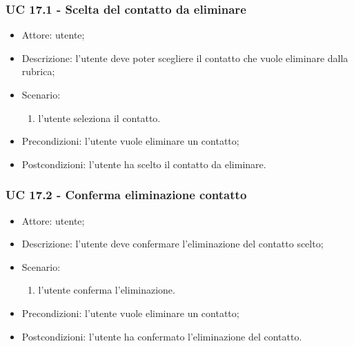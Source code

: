 \subsubsection{UC 17.1 - Scelta del contatto da eliminare} \label{sec: UC 17.1}
\begin{itemize}
    \item Attore: utente;
    \item Descrizione: l'utente deve poter scegliere il contatto che vuole eliminare dalla rubrica;
    \item Scenario:
        \begin{enumerate}
        \item l'utente seleziona il contatto.
        \end{enumerate}
    
    \item Precondizioni: l'utente vuole eliminare un contatto;
    \item Postcondizioni: l'utente ha scelto il contatto da eliminare.
\end{itemize}


\subsubsection{UC 17.2 - Conferma eliminazione contatto} \label{sec: UC 17.2}
\begin{itemize}
    \item Attore: utente;
    \item Descrizione: l'utente deve confermare l'eliminazione del contatto scelto;
    \item Scenario:
        \begin{enumerate}
        \item l'utente conferma l'eliminazione.
        \end{enumerate}
    
    \item Precondizioni: l'utente vuole eliminare un contatto;
    \item Postcondizioni: l'utente ha confermato l'eliminazione del contatto.
\end{itemize}


